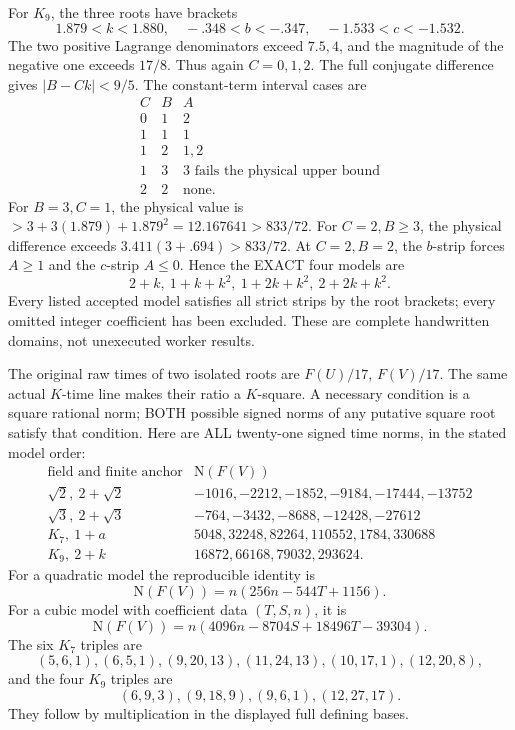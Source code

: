 \documentclass[11pt]{article}
\begin{document}
For \(K_9\), the three roots have brackets
\[
 1.879<k<1.880,\quad -.348<b<-.347,\quad -1.533<c<-1.532 .
\]
The two positive Lagrange denominators exceed \(7.5,4\),
and the magnitude of the negative one exceeds \(17/8\).
Thus again \(C=0,1,2\).
The full conjugate difference gives \(|B-Ck|<9/5\).
The constant-term interval cases are
\[
\begin{array}{c|c|c}
C&B&A\\ \hline
0&1&2\\
1&1&1\\
1&2&1,2\\
1&3&3\text{ fails the physical upper bound}\\
2&2&\text{none}.
\end{array}
\]
For \(B=3,C=1\), the physical value is
\(>3+3(1.879)+1.879^2=12.167641>833/72\).
For \(C=2,B\ge3\), the physical difference exceeds
\(3.411(3+.694)>833/72\).
At \(C=2,B=2\), the \(b\)-strip forces \(A\ge1\) and
the \(c\)-strip \(A\le0\).
Hence the EXACT four models are
\[
                     2+k,\ 1+k+k^2,\ 1+2k+k^2,\ 2+2k+k^2 .
\]
Every listed accepted model satisfies all strict strips by the
root brackets; every omitted integer coefficient has been excluded.
These are complete handwritten domains, not unexecuted worker results.

The original raw times of two isolated roots are \(F(U)/17\),
\(F(V)/17\).
The same actual \(K\)-time line makes their ratio a \(K\)-square.
A necessary condition is a square rational norm; BOTH possible
signed norms of any putative square root satisfy that condition.
Here are ALL twenty-one signed time norms, in the stated model order:
\[
\begin{array}{c|l}
\text{field and finite anchor}&\mathrm N(F(V))\\ \hline
\sqrt2,\ 2+\sqrt2&
 -1016,-2212,-1852,-9184,-17444,-13752\\
\sqrt3,\ 2+\sqrt3&
 -764,-3432,-8688,-12428,-27612\\
K_7,\ 1+a&
 5048,32248,82264,110552,1784,330688\\
K_9,\ 2+k&
 16872,66168,79032,293624 .
\end{array}
\]
For a quadratic model the reproducible identity is
\[
 \mathrm N(F(V))=n(256n-544T+1156).
\]
For a cubic model with coefficient data \((T,S,n)\), it is
\[
 \mathrm N(F(V))
      =n(4096n-8704S+18496T-39304).
\]
The six \(K_7\) triples are
\[
 (5,6,1),(6,5,1),(9,20,13),(11,24,13),(10,17,1),(12,20,8),
\]
and the four \(K_9\) triples are
\[
                     (6,9,3),(9,18,9),(9,6,1),(12,27,17).
\]
They follow by multiplication in the displayed full defining bases.
\end{document}
